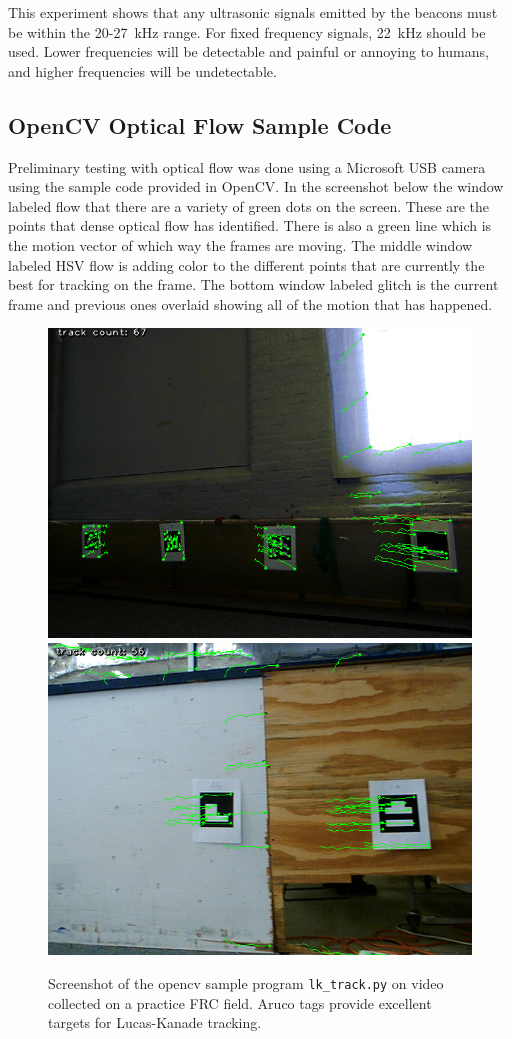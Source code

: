 \documentclass{article}
\begin{document}
    This experiment shows that any ultrasonic signals emitted by the beacons must be within the 20-27\SI{}{\kilo\hertz} range. For fixed frequency signals, \SI{22}{\kilo\hertz} should be used. Lower frequencies will be detectable and painful or annoying to humans, and higher frequencies will be undetectable.

	\subsection{OpenCV Optical Flow Sample Code}

    Preliminary testing with optical flow was done using a Microsoft USB camera using the sample code provided in OpenCV. In the screenshot below the window labeled flow that there are a variety of green dots on the screen. These are the points that dense optical flow has identified. There is also a green line which is the motion vector of which way the frames are moving. The middle window labeled HSV flow is adding color to the different points that are currently the best for tracking on the frame. The bottom window labeled glitch is the current frame and previous ones overlaid showing all of the motion that has happened.

    \begin{figure}[H]
      \centering
      \includegraphics[width=0.49\linewidth]{./images/optflow.png}
      \includegraphics[width=0.49\linewidth]{./images/optflow_2.png}
      \caption{Screenshot of the opencv sample program \texttt{lk\_track.py} on video collected on a practice FRC field. Aruco tags provide excellent targets for Lucas-Kanade tracking.}
      \label{fig:opt_flow}
    \end{figure}
\end{document}
